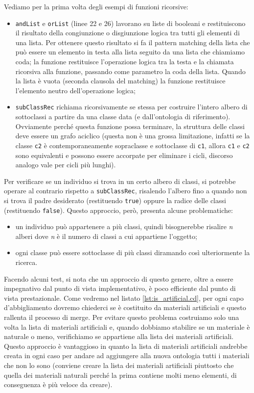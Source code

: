 Vediamo per la prima volta degli esempi di funzioni ricorsive:
\begin{itemize}
	\item \verb|andList| e \verb|orList| (linee 22 e 26) lavorano su liste di booleani e restituiscono il risultato della congiunzione o disgiunzione logica tra tutti gli elementi di una lista. Per ottenere questo risultato si fa il pattern matching della lista che può essere un elemento in testa alla lista seguito da una lista che chiamiamo coda; la funzione restituisce l'operazione logica tra la testa e la chiamata ricorsiva alla funzione, passando come parametro la coda della lista. Quando la lista è vuota (seconda clausola del matching) la funzione restituisce l'elemento neutro dell'operazione logica;
	\item \verb|subClassRec| richiama ricorsivamente se stessa per costruire l'intero albero di sottoclassi a partire da una classe data (e dall'ontologia di riferimento). Ovviamente perché questa funzione possa terminare, la struttura delle classi deve essere un grafo aciclico (questa non è una grossa limitazione, infatti se la classe \verb|c2| è contemporaneamente sopraclasse e sottoclasse di \verb|c1|, allora \verb|c1| e \verb|c2| sono equivalenti e possono essere accorpate per eliminare i cicli, discorso analogo vale per cicli più lunghi).
\end{itemize}

Per verificare se un individuo si trova in un certo albero di classi, si potrebbe operare al contrario rispetto a \verb|subClassRec|, risalendo l'albero fino a quando non si trova il padre desiderato (restituendo \verb|true|) oppure la radice delle classi (restituendo \verb|false|). Questo approccio, però, presenta alcune problematiche:
\begin{itemize}
	\item un individuo può appartenere a più classi, quindi bisognerebbe risalire \emph{n} alberi dove \emph{n} è il numero di classi a cui appartiene l'oggetto;
	\item ogni classe può essere sottoclasse di più classi diramando così ulteriormente la ricerca.
\end{itemize}
Facendo alcuni test, si nota che un approccio di questo genere, oltre a essere impegnativo dal punto di vista implementativo, è poco efficiente dal punto di vista prestazionale. Come vedremo nel listato \ref{lst:is_artificial.cd}, per ogni capo d'abbigliamento dovremo chiederci se è costituito da materiali artificiali e questo rallenta il processo di merge. Per evitare questo problema costruiamo solo una volta la lista di materiali artificiali e, quando dobbiamo stabilire se un materiale è naturale o meno, verifichiamo se appartiene alla lista dei materiali artificiali. Questo approccio è vantaggioso in quanto la lista di materiali artificiali andrebbe creata in ogni caso per andare ad aggiungere alla nuova ontologia tutti i materiali che non lo sono (conviene creare la lista dei materiali artificiali piuttosto che quella dei materiali naturali perché la prima contiene molti meno elementi, di conseguenza è più veloce da creare).

